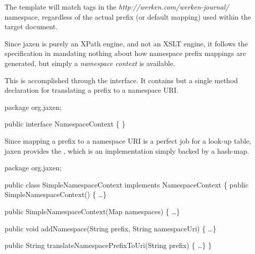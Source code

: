 \documentclass[20pt,landscape,headrule,footrule]{foils}
\begin{document}

The template will match  tags in the
\emph{http://werken.com/werken-journal/} namespace, 
regardless of the actual prefix (or default mapping) used within the
target document.

\begin{codelisting}
\end{codelisting}

\begin{codelisting}
\end{codelisting}



Since jaxen is purely an XPath engine, and not an XSLT engine,
it follows the specification in mandating nothing about how
namespace prefix mappings are generated, but simply a \emph{namespace
context} is available.

This is accomplished through the 
interface.  It contains but a single method declaration for
translating a prefix to a namespace URI.

\begin{codelisting}
package org.jaxen;

public interface NamespaceContext
\{
\}
\end{codelisting}



Since mapping a prefix to a namespace URI is a perfect job for a
look-up table, jaxen provides the
, which is an implementation
simply backed by a hash-map.

\begin{codelisting}
package org.jaxen;

public class SimpleNamespaceContext
    implements NamespaceContext
\{
    public SimpleNamespaceContext() \{ \dots \}

    public SimpleNamespaceContext(Map namespaces) \{ \dots \}

    public void addNamespace(String prefix, 
                             String namespaceUri) \{ \dots \}

    public String translateNamespacePrefixToUri(String prefix) \{ \dots \}
\}
\end{codelisting}
\end{document}
